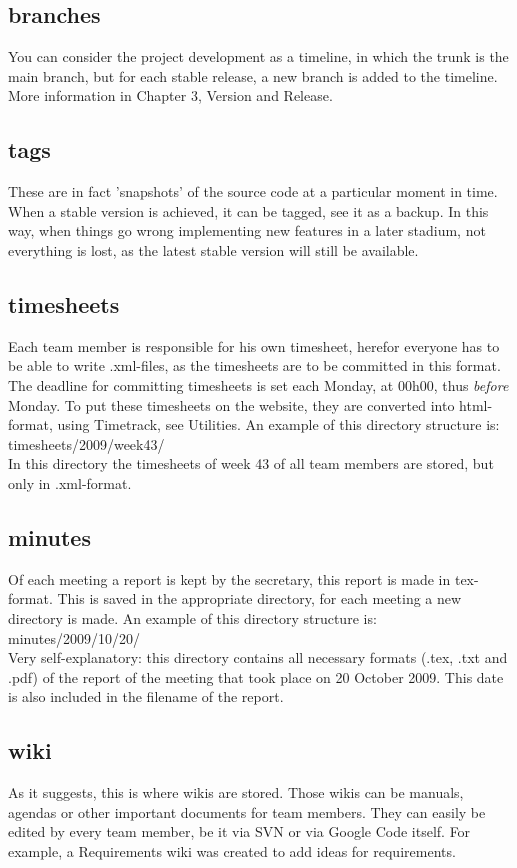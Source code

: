 \documentclass{report}
\begin{document}
\subsection{branches}
You can consider the project development as a timeline, in which the trunk is the main branch, but for each stable release, a new branch is added to the timeline.
More information in Chapter 3, Version and Release.
\subsection{tags}
These are in fact 'snapshots' of the source code at a particular moment in time.
When a stable version is achieved, it can be tagged, see it as a backup.
In this way, when things go wrong implementing new features in a later stadium, not everything is lost, as the latest stable version will still be available.
\subsection{timesheets}
Each team member is responsible for his own timesheet, herefor everyone has to be able to write .xml-files, as the timesheets are to be committed in this format.
The deadline for committing timesheets is set each Monday, at 00h00, thus {\it before} Monday.
To put these timesheets on the website, they are converted into html-format, using Timetrack, see Utilities.
An example of this directory structure is:\\
timesheets/2009/week43/\\
In this directory the timesheets of week 43 of all team members are stored, but only in .xml-format.
\subsection{minutes}
Of each meeting a report is kept by the secretary, this report is made in tex-format.
This is saved in the appropriate directory, for each meeting a new directory is made.
An example of this directory structure is:\\
minutes/2009/10/20/\\
Very self-explanatory: this directory contains all necessary formats (.tex, .txt and .pdf) of the report of the meeting that took place on 20 October 2009.
This date is also included in the filename of the report.
\subsection{wiki}
As it suggests, this is where wikis are stored.
Those wikis can be manuals, agendas or other important documents for team members.
They can easily be edited by every team member, be it via SVN or via Google Code itself.
For example, a Requirements wiki was created to add ideas for requirements.
\end{document}
